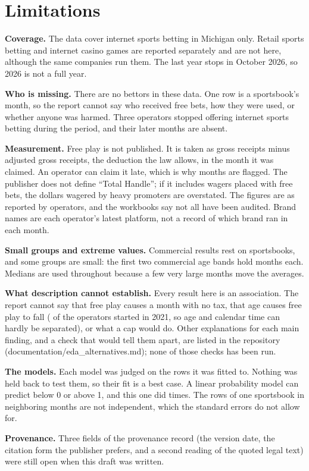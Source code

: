 \section{Limitations}\label{sec:limits}

\textbf{Coverage.} The data cover internet sports betting in Michigan only. Retail sports betting and internet casino games are reported separately and are not here, although the same companies run them. The last year stops in October 2026, so 2026 is not a full year.

\textbf{Who is missing.} There are no bettors in these data. One row is a sportsbook's month, so the report cannot say who received free bets, how they were used, or whether anyone was harmed. Three operators stopped offering internet sports betting during the period, and their later months are absent.

\textbf{Measurement.} Free play is not published. It is taken as gross receipts minus adjusted gross receipts, the deduction the law allows, in the month it was claimed. An operator can claim it late, which is why  months are flagged. The publisher does not define ``Total Handle''; if it includes wagers placed with free bets, the dollars wagered by heavy promoters are overstated. The figures are as reported by operators, and the workbooks say not all have been audited. Brand names are each operator's latest platform, not a record of which brand ran in each month.

\textbf{Small groups and extreme values.} Commercial results rest on  sportsbooks, and some groups are small: the first two commercial age bands hold  months each. Medians are used throughout because a few very large months move the averages.

\textbf{What description cannot establish.} Every result here is an association. The report cannot say that free play causes a month with no tax, that age causes free play to fall ( of the  operators started in 2021, so age and calendar time can hardly be separated), or what a cap would do. Other explanations for each main finding, and a check that would tell them apart, are listed in the repository (documentation/eda\_alternatives.md); none of those checks has been run.

\textbf{The models.} Each model was judged on the rows it was fitted to. Nothing was held back to test them, so their fit is a best case. A linear probability model can predict below 0 or above 1, and this one did  times. The rows of one sportsbook in neighboring months are not independent, which the standard errors do not allow for.

\textbf{Provenance.} Three fields of the provenance record (the version date, the citation form the publisher prefers, and a second reading of the quoted legal text) were still open when this draft was written.
